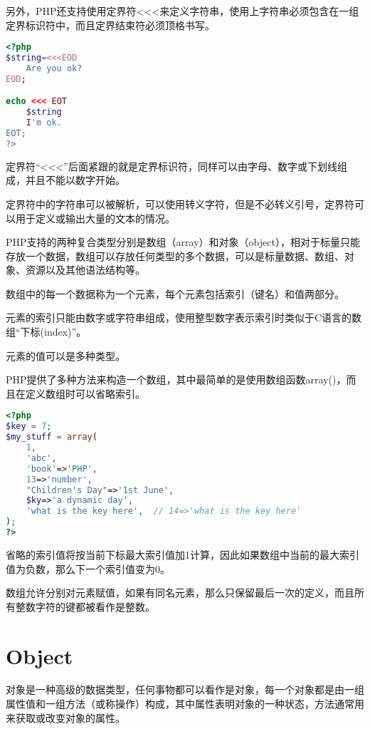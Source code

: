 另外，PHP还支持使用定界符<\/<\/<来定义字符串，使用上字符串必须包含在一组定界标识符中，而且定界结束符必须顶格书写。

\begin{lstlisting}[language=PHP]
<?php
$string=<<<EOD
	Are you ok?
EOD;

echo <<< EOT
	$string
	I'm ok.
EOT;
?>
\end{lstlisting}

定界符“<\/<\/<”后面紧跟的就是定界标识符，同样可以由字母、数字或下划线组成，并且不能以数字开始。

定界符中的字符串可以被解析，可以使用转义字符，但是不必转义引号，定界符可以用于定义或输出大量的文本的情况。

PHP支持的两种复合类型分别是数组（array）和对象（object），相对于标量只能存放一个数据，数组可以存放任何类型的多个数据，可以是标量数据、数组、对象、资源以及其他语法结构等。



\begin{compactitem}
\item 数组中的每一个数据称为一个元素，每个元素包括索引（键名）和值两部分。
\item 元素的索引只能由数字或字符串组成，使用整型数字表示索引时类似于C语言的数组“下标(index)”。
\item 元素的值可以是多种类型。
\end{compactitem}

PHP提供了多种方法来构造一个数组，其中最简单的是使用数组函数array()，而且在定义数组时可以省略索引。

\begin{lstlisting}[language=PHP]
<?php
$key = 7;
$my_stuff = array(
	1,
	'abc',
	'book'=>'PHP',
	13=>'number',
	"Children's Day"=>'1st June',
	$ky=>'a dynamic day',
	'what is the key here',  // 14=>'what is the key here'
);
?>
\end{lstlisting}

省略的索引值将按当前下标最大索引值加1计算，因此如果数组中当前的最大索引值为负数，那么下一个索引值变为0。

数组允许分别对元素赋值，如果有同名元素，那么只保留最后一次的定义，而且所有整数字符的键都被看作是整数。

\section{Object}


对象是一种高级的数据类型，任何事物都可以看作是对象，每一个对象都是由一组属性值和一组方法（或称操作）构成，其中属性表明对象的一种状态，方法通常用来获取或改变对象的属性。





